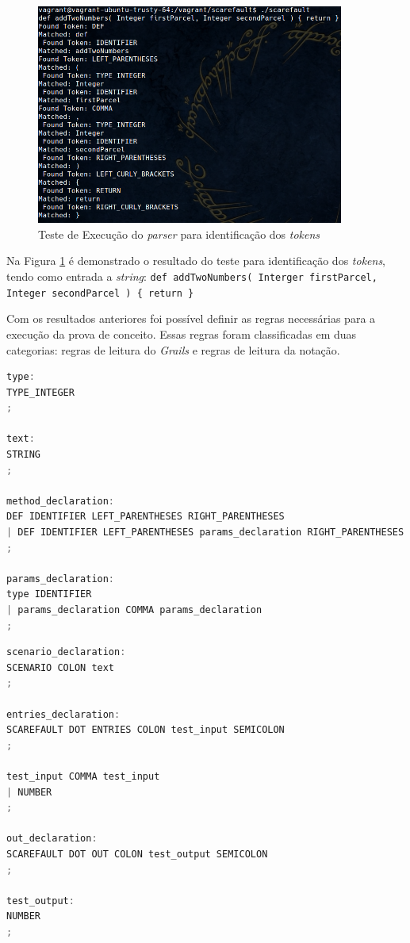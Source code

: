  \begin{figure}[h]
    \centering
    \includegraphics[width=0.9\textwidth]{figuras/second-test-grammar.png}
    \caption{Teste de Execução do \textit{parser} para identificação dos \textit{tokens}}
    \label{fig:test-tokens}
 \end{figure}
\par
\indent Na Figura \ref{fig:test-tokens} é demonstrado o resultado do teste para identificação dos \textit{tokens}, tendo como entrada a \textit{string}: \lstinline|def addTwoNumbers( Interger firstParcel, Integer secondParcel ) { return }|
\par
\indent Com os resultados anteriores foi possível definir as regras necessárias para a execução da prova de conceito. Essas regras foram classificadas em duas categorias: regras de leitura do \textit{Grails} e regras de leitura da notação.
\par
\begin{lstlisting}[language=C++, label=rules-grails, caption=Regras de Leitura do \textit{Grails}]
type:
TYPE_INTEGER
;

text:
STRING
;

method_declaration:
DEF IDENTIFIER LEFT_PARENTHESES RIGHT_PARENTHESES
| DEF IDENTIFIER LEFT_PARENTHESES params_declaration RIGHT_PARENTHESES
;

params_declaration:
type IDENTIFIER
| params_declaration COMMA params_declaration
;
\end{lstlisting}
\par 
\begin{lstlisting}[language=C++, label=rules-scarefault, caption=Regras de Leitura da notação]
scenario_declaration:
SCENARIO COLON text
;

entries_declaration:
SCAREFAULT DOT ENTRIES COLON test_input SEMICOLON
;

test_input COMMA test_input
| NUMBER
;

out_declaration:
SCAREFAULT DOT OUT COLON test_output SEMICOLON
;

test_output:
NUMBER
;
\end{lstlisting}
